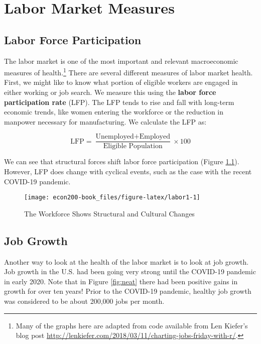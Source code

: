 \documentclass[
]{book}
\begin{document}
\hypertarget{labor}{%
\chapter{Labor Market Measures}\label{labor}}

\hypertarget{labor-force-participation}{%
\section{Labor Force Participation}\label{labor-force-participation}}

The labor market is one of the most important and relevant macroeconomic measures of health.\footnote{Many of the graphs here are adapted from code available from Len Kiefer's blog post \url{http://lenkiefer.com/2018/03/11/charting-jobs-friday-with-r/}.} There are several different measures of labor market health. First, we might like to know what portion of eligible workers are engaged in either working or job search. We measure this using the \textbf{labor force participation rate} (LFP). The LFP tends to rise and fall with long-term economic trends, like women entering the workforce or the reduction in manpower necessary for manufacturing. We calculate the LFP as:

\[ \text{LFP} = \frac{\text{Unemployed}+\text{Employed}}{\text{Eligible Population}} \times 100 \]

We can see that structural forces shift labor force participation (Figure \ref{fig:labor1}). However, LFP does change with cyclical events, such as the case with the recent COVID-19 pandemic.

\begin{figure}

{\centering \texttt{[image: econ200-book\_files/figure-latex/labor1-1]} 

}

\caption{The Workforce Shows Structural and Cultural Changes}\label{fig:labor1}
\end{figure}

\hypertarget{job-growth}{%
\section{Job Growth}\label{job-growth}}

Another way to look at the health of the labor market is to look at job growth. Job growth in the U.S. had been going very strong until the COVID-19 pandemic in early 2020. Note that in Figure \ref{fig:neat} there had been positive gains in growth for over ten years! Prior to the COVID-19 pandemic, healthy job growth was considered to be about 200,000 jobs per month.
\end{document}
